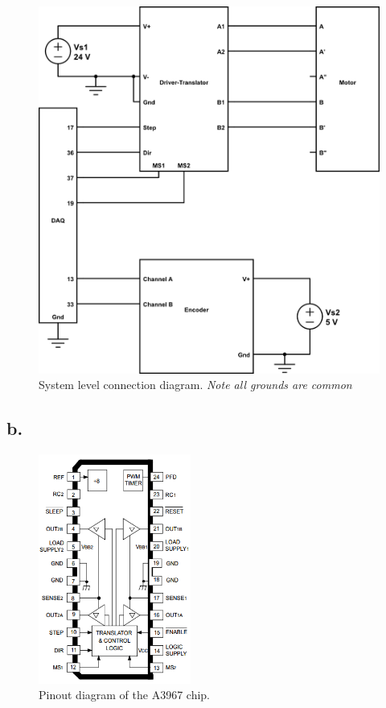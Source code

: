 \documentclass{article}
\theoremstyle{plain}
\theoremstyle{definition}
\theoremstyle{remark}
\begin{document}
\begin{figure}[htb]
\begin{center}
\includegraphics[width = 12cm]{lab5_main.png}
\caption{System level connection diagram. \emph{Note all grounds are common}}
\label{q1_a}
\end{center}
\end{figure}

\subsection*{b.}
\begin{figure}[htb]
\begin{center}
\includegraphics[width = 5cm]{A3967_pinout.png}
\caption{Pinout diagram of the A3967 chip.}
\label{q1_b}
\end{center}
\end{figure}
\end{document}
